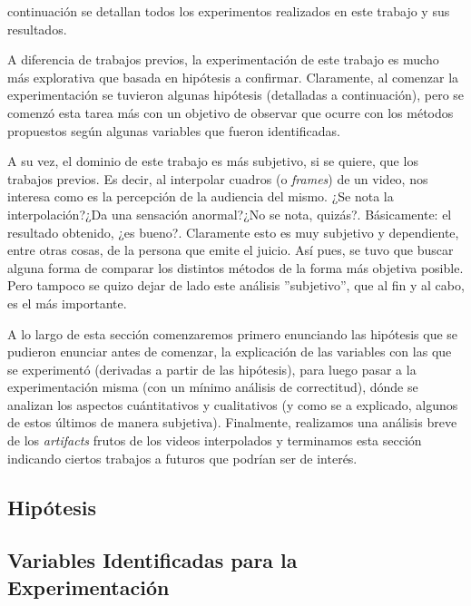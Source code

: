  continuaci\'on se detallan todos los experimentos realizados
en este trabajo y sus resultados.

\par A diferencia de trabajos previos, la experimentaci\'on de este trabajo es
mucho m\'as explorativa que basada en hip\'otesis a confirmar. Claramente, al
comenzar la experimentaci\'on se tuvieron algunas hip\'otesis (detalladas a
continuaci\'on), pero se comenz\'o esta tarea m\'as con un objetivo de observar
que ocurre con los m\'etodos propuestos seg\'un algunas variables que fueron
identificadas.

\par A su vez, el dominio de este trabajo es m\'as subjetivo, si se quiere, que
los trabajos previos. Es decir, al interpolar cuadros (o \emph{frames}) de un
video, nos interesa como es la percepci\'on de la audiencia del mismo. ¿Se nota
la interpolaci\'on?¿Da una sensaci\'on anormal?¿No se nota, quiz\'as?.
B\'asicamente: el resultado obtenido, ¿es bueno?. Claramente esto es muy
subjetivo y dependiente, entre otras cosas, de la persona que emite el juicio.
As\'i pues, se tuvo que buscar alguna forma de comparar los distintos m\'etodos
de la forma m\'as objetiva posible. Pero tampoco se quizo dejar de lado este
an\'alisis ''subjetivo'', que al fin y al cabo, es el m\'as importante.

\par A lo largo de esta secci\'on comenzaremos primero enunciando las
hip\'otesis que se pudieron enunciar antes de comenzar, la explicaci\'on de las
variables con las que se experiment\'o (derivadas a partir de las hip\'otesis),
para luego pasar a la experimentaci\'on misma (con un m\'inimo an\'alisis de
correctitud), d\'onde se analizan los aspectos cu\'antitativos y cualitativos
(y como se a explicado, algunos de estos \'ultimos de manera subjetiva).
Finalmente, realizamos una an\'alisis breve de los \emph{artifacts} frutos de
los videos interpolados y terminamos esta secci\'on indicando ciertos trabajos
a futuros que podr\'ian ser de inter\'es.

\subsection{Hip\'otesis}


\subsection{Variables Identificadas para la Experimentaci\'on}


